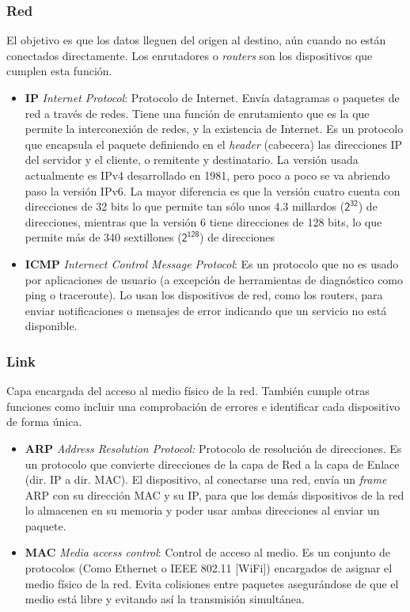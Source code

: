 \documentclass[a4paper, 11pt]{report} %
\begin{document}
\subsubsection{Red}
El objetivo es que los datos lleguen del origen al destino, aún cuando no están conectados directamente. Los enrutadores o \textit{routers} son los dispositivos que cumplen esta función.
\begin{itemize}
\item \textbf{IP} \textit{Internet Protocol}: Protocolo de Internet. Envía datagramas o paquetes de red a través de redes. Tiene una función de enrutamiento que es la que permite la interconexión de redes, y la existencia de Internet. Es un protocolo que encapsula el paquete definiendo en el \textit{header} (cabecera) las direcciones IP del servidor y el cliente, o remitente y destinatario. La versión usada actualmente es IPv4 desarrollado en 1981, pero poco a poco se va abriendo paso la versión IPv6. La mayor diferencia es que la versión cuatro cuenta con direcciones de 32 bits lo que permite tan sólo unos 4.3 millardos ($\mathsf{2^{32}}$) de direcciones, mientras que la versión 6 tiene direcciones de 128 bits, lo que permite más de 340 sextillones ($\mathsf{2^{128}}$) de direcciones
\item \textbf{ICMP} \textit{Internect Control Message Protocol}: Es un protocolo que no es usado por aplicaciones de usuario (a excepción de herramientas de diagnóstico como ping o traceroute). Lo usan los dispositivos de red, como los routers, para enviar notificaciones o mensajes de error indicando que un servicio no está disponible.
\end{itemize}
\subsubsection{Link}
Capa encargada del acceso al medio físico de la red. También cumple otras funciones como incluir una comprobación de errores e identificar cada dispositivo de forma única.
\begin{itemize}
\item \textbf{ARP} \textit{Address Resolution Protocol:} Protocolo de resolución de direcciones. Es un protocolo que convierte direcciones de la capa de Red a la capa de Enlace (dir. IP a dir. MAC). El dispositivo, al conectarse una red, envía un \textit{frame} ARP con su dirección MAC y su IP, para que los demás dispositivos de la red lo almacenen en su memoria y poder usar ambas direcciones al enviar un paquete.
\item \textbf{MAC} \textit{Media access control}: Control de acceso al medio. Es un conjunto de protocolos (Como Ethernet o IEEE 802.11 [WiFi]) encargados de asignar el medio físico de la red. Evita colisiones entre paquetes asegurándose de que el medio está libre y evitando así la transmisión simultánea.
\end{itemize}
\end{document}
